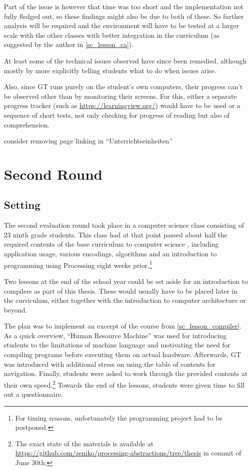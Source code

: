 Part of the issue is however that time was too short and the implementation not fully fledged out, so these findings might also be due to both of these. So further analysis will be required and the environment will have to be tested at a larger scale with the other classes with better integration in the curriculum (as suggested by the author in \ref{sc_lesson_ca}).

At least some of the technical issues observed have since been remedied, although mostly by more explicitly telling students what to do when issues arise.

Also, since \ac{GT} runs purely on the student's own computers, their progress can't be observed other than by monitoring their screens. For this, either a separate progress tracker (such as \url{https://learningview.org/}) would have to be used or a sequence of short tests, not only checking for progress of reading but also of comprehension.

\begin{todo}
\item consider removing page linking in ``Unterrichtseinheiten''
\end{todo}



\section{Second Round} \label{sc_validation_compiler} %

\subsection{Setting}

The second evaluation round took place in a computer science class consisting of 23 ninth grade students. This class had at that point passed about half the required contents of the base curriculum to computer science \cite[p.\,145--146]{Erz16}, including application usage, various encodings, algorithms and an introduction to programming using Processing eight weeks prior.\footnote{For timing reasons, unfortunately the programming project had to be postponed.}

Two lessons at the end of the school year could be set aside for an introduction to compilers as part of this thesis. These would usually have to be placed later in the curriculum, either together with the introduction to computer architecture or beyond.

The plan was to implement an excerpt of the course from \ref{sc_lesson_compiler}. As a quick overview, ``Human Resource Machine'' was used for introducing students to the limitations of machine language and motivating the need for compiling programs before executing them on actual hardware. Afterwards, \ac{GT} was introduced with additional stress on using the table of contents for navigation. Finally, students were asked to work through the provided contents at their own speed.\footnote{The exact state of the materials is available at \url{https://github.com/zeniko/processing-abstractions/tree/thesis} in commit  of June 30th.} Towards the end of the lessons, students were given time to fill out a questionnaire.

